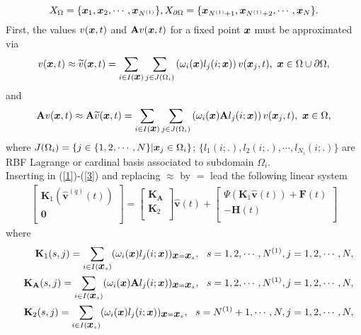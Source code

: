 \documentclass[9pt]{article}
\numberwithin{equation}{section}
\def\bfm#1{\protect{\makebox{\boldmath $#1$}}}
\def\x {\bfm{x}}
\begin{document}
\[X_{\Omega}=\{\x_{1},\x_{2},\cdots,\x_{N^{(1)}}\},X_{\partial \Omega}=\{\x_{N^{(1)}+1},\x_{N^{(1)}+2},\cdots,\x_{N}\}.\]
First, the values $v(\x,t)$ and $\mathbf{A} v(\x,t)$  for
a fixed point $\x$ must be approximated via
\begin{eqnarray}\label{ABaf20}
v(\x,t)\approx \widetilde{v}(\x,t)=\sum_{i \in I(\x)}\sum_{j \in J(\Omega_{i})}\left(\omega_{i}(\x)l_{j}(i;\x)\right)v(\x_{j},t),~\x \in \Omega \cup \partial \Omega,
\end{eqnarray}
and
\begin{eqnarray}\label{ABaf19}
\mathbf{A} v(\x,t)\approx \mathbf{A} \widetilde{v}(\x,t)=\sum_{i \in I(\x)}\sum_{j \in J(\Omega_{i})}\left(\omega_{i}(\x)\mathbf{A}l_{j}(i;\x)\right)v(\x_{j},t),~ \x \in \Omega,
\end{eqnarray}
where $J(\Omega_{i})=\{j\in \{1,2,\cdots,N\}|\x_{j}\in \Omega_{i}\}$;
 $\{l_{1}(i;.),l_{2}(i;.),\cdots,l_{N_{i}}(i;.)\}$ are RBF Lagrange or cardinal basis associated to subdomain $\Omega_{i}$.\\
Inserting in (\ref{1})-(\ref{3}) and replacing $\approx$ by $=$ lead the following linear system
\begin{eqnarray*}
\left[
  \begin{array}{c}
    \textbf{K}_{1}\left(\widehat{\textbf{v}}^{(q)}(t)\right)\\
    \textbf{0}\\
  \end{array}
\right]=\left[
          \begin{array}{cc}
            \textbf{K}_{\mathbf{A}}  \\
           \textbf{K}_{2} \\
          \end{array}
        \right]
                  \widehat{\textbf{v}}(t) +\left[
                         \begin{array}{c}
                           \Psi(\textbf{K}_{1}\widehat{\textbf{v}}(t)) +\textbf{F}(t) \\
                           -\textbf{H}(t) \\
                         \end{array}
                       \right]
\end{eqnarray*}
where
\begin{eqnarray*}
&&\textbf{K}_{1}(s,j)=\sum_{i \in I(\x_{s})}(\omega_{i}(\x)l_{j}(i;\x))_{\x=\x_{s}},~~s=1,2,\cdots,N^{(1)},j=1,2,\cdots,N,\\
 &&\textbf{K}_{\mathbf{A}}(s,j)=\sum_{i \in I(\x_{s})}(\omega_{i}(\x)\mathbf{A}l_{j}(i;\x))_{\x=\x_{s}},~~s=1,2,\cdots,N^{(1)},j=1,2,\cdots,N,\\
 &&\textbf{K}_{2}(s,j)=\sum_{i \in I(\x_{s})}(\omega_{i}(\x)l_{j}(i;\x))_{\x=\x_{s}},~~s=N^{(1)}+1,\cdots,N,j=1,2,\cdots,N,
\end{eqnarray*}
\end{document}

